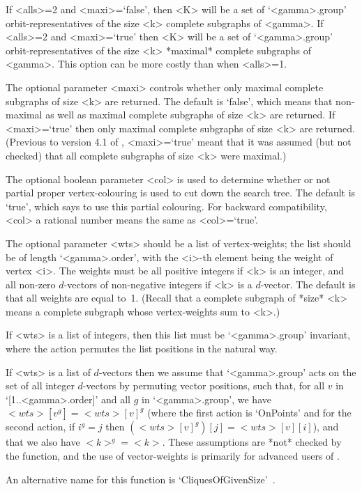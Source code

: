 If <alls>=2 and <maxi>=`false', then <K> will be a set of `<gamma>.group'
orbit-representatives of the size <k> complete subgraphs of <gamma>.
If <alls>=2 and <maxi>=`true' then <K> will be a set of `<gamma>.group'
orbit-representatives of the size <k> *maximal* complete subgraphs
of <gamma>.  This option can be more costly than when <alls>=1.

The optional parameter <maxi> controls whether only maximal complete
subgraphs of size <k> are returned.  The default is `false', which means
that non-maximal as well as maximal complete subgraphs of size <k> are
returned. If <maxi>=`true' then only maximal complete subgraphs of size
<k> are returned. (Previous to version 4.1 of {\GRAPE}, <maxi>=`true'
meant that it was assumed (but not checked) that all complete subgraphs
of size <k> were maximal.)

The optional boolean parameter <col> is used to determine whether or not
partial proper vertex-colouring is used to cut down the search tree. The
default is `true', which says to use this partial colouring.  For backward
compatibility, <col> a rational number means the same as <col>=`true'.

The optional parameter <wts> should be a list of vertex-weights; the list
should be of length `<gamma>.order', with the <i>-th element being the
weight of vertex <i>. The weights must be all positive integers if <k>
is an integer, and all non-zero $d$-vectors of non-negative integers
if <k> is a $d$-vector. The default is that all weights are equal to~1.
(Recall that a complete subgraph of *size* <k> means a complete subgraph
whose vertex-weights sum to <k>.)

If <wts> is a list of integers, then this list must be `<gamma>.group'
invariant, where the action permutes the list positions in the natural
way.

If <wts> is a list of $d$-vectors then we assume that `<gamma>.group' acts
on the set of all integer $d$-vectors by permuting vector positions, such
that, for all $v$ in `[1..<gamma>.order]' and all $g$ in `<gamma>.group',
we have $<wts>[v^g] = <wts>[v]^g$ (where the first action is `OnPoints'
and for the second action, if $i^g=j$ then $(<wts>[v]^g)[j]=<wts>[v][i]$),
and that we also have $<k>^g=<k>$.  These assumptions are *not* checked
by the function, and the use of vector-weights is primarily for advanced
users of {\GRAPE}.

An alternative name for this function is 
`CliquesOfGivenSize'~.

